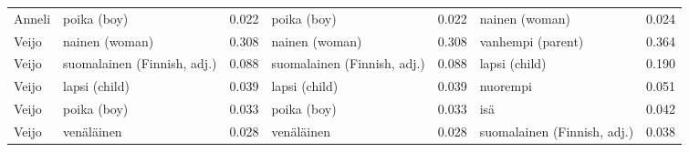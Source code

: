 \begin{longtable}{llrlrlr}
Anneli &                 poika (boy) &                            0.022 &                 poika (boy) &                                 0.022 &              nainen (woman) &                           0.024 \\
 Veijo &              nainen (woman) &                            0.308 &              nainen (woman) &                                 0.308 &           vanhempi (parent) &                           0.364 \\
 Veijo & suomalainen (Finnish, adj.) &                            0.088 & suomalainen (Finnish, adj.) &                                 0.088 &               lapsi (child) &                           0.190 \\
 Veijo &               lapsi (child) &                            0.039 &               lapsi (child) &                                 0.039 &                    nuorempi &                           0.051 \\
 Veijo &                 poika (boy) &                            0.033 &                 poika (boy) &                                 0.033 &                         isä &                           0.042 \\
 Veijo &                  venäläinen &                            0.028 &                  venäläinen &                                 0.028 & suomalainen (Finnish, adj.) &                           0.038 \\
\end{longtable}
